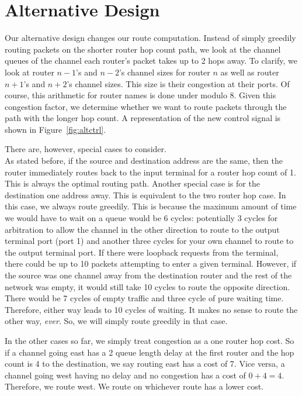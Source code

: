 \documentclass[10pt]{article}
\begin{document}
\section{Alternative Design}

Our alternative design changes our route computation. 
Instead of simply greedily routing packets on the shorter router hop count
path, we look at the channel queues of the channel each router's packet 
takes up to 2 hops away. 
To clarify, we look at router $n-1$'s and $n-2$'s channel sizes 
for router $n$ as well as router $n+1$'s and $n+2$'s channel sizes.
This size is their congestion at their ports. 
Of course, this arithmetic for router names is done under modulo 8. 
Given this congestion factor, we determine whether we want to route packets 
through the path with the longer hop count. 
A representation of the new control signal is shown in 
Figure~\ref{fig:altctrl}.\par

There are, however, special cases to consider. \\
As stated before, if the source and destination address are the same, then the
router immediately routes back to the input terminal for a router hop count 
of 1.
This is always the optimal routing path.
Another special case is for the destination one address away. 
This is equivalent to the two router hop case.
In this case, we always route greedily. 
This is because the maximum amount of time we would have to wait on a queue
would be 6 cycles: 
potentially 3 cycles for arbitration to allow the channel in the other 
direction to route to the output terminal port (port 1) and another three
cycles for your own channel to route to the output terminal port.
If there were loopback requests from the terminal, there could be up to 10 
packets attempting to enter a given terminal.
However, if the source was one channel away from the destination router and the
rest of the network was empty, it would still take 10 cycles to route the 
opposite direction. 
There would be 7 cycles of empty traffic and three cycle of pure waiting time.
Therefore, either way leads to 10 cycles of waiting.
It makes no sense to route the other way, \textit{ever}.
So, we will simply route greedily in that case. \par

In the other cases so far, we simply treat congestion as a one router hop 
cost.
So if a channel going east has a 2 queue length delay at the first router 
and the hop count is 4 to the destination, we say routing east has a cost of 7.
Vice versa, a channel going west having no delay and no congestion has a cost
of $ 0 + 4 =4 $. 
Therefore, we route west. 
We route on whichever route has a lower cost. \par
\end{document}
